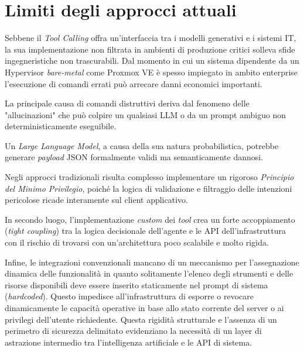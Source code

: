 \section{Limiti degli approcci attuali}
Sebbene il \textit{Tool Calling} offra un'interfaccia tra i modelli generativi e i sistemi IT, la sua implementazione non filtrata in ambienti di produzione critici solleva sfide ingegneristiche non trascurabili.
Dal momento in cui un sistema dipendente da un Hypervisor \textit{bare-metal} come Proxmox VE è spesso impiegato in ambito enterprise l'esecuzione di comandi errati può arrecare danni economici importanti.

La principale causa di comandi distruttivi deriva dal fenomeno delle "allucinazioni" che può colpire un qualsiasi LLM o da un prompt ambiguo non deterministicamente eseguibile.

Un \textit{Large Language Model}, a causa della sua natura probabilistica, potrebbe generare \textit{payload} JSON formalmente validi ma semanticamente dannosi.

Negli approcci tradizionali risulta complesso implementare un rigoroso \textit{Principio del Minimo Privilegio}, poiché la logica di validazione e filtraggio delle intenzioni pericolose ricade interamente sul client applicativo.

In secondo luogo, l'implementazione \textit{custom} dei \textit{tool} crea un forte accoppiamento (\textit{tight coupling}) tra la logica decisionale dell'agente e le API dell'infrastruttura con il rischio di trovarsi con un'architettura poco scalabile e molto rigida.

Infine, le integrazioni convenzionali mancano di un meccanismo per l'assegnazione dinamica delle funzionalità in quanto solitamente l'elenco degli strumenti e delle risorse disponibili deve essere inserito staticamente nel prompt di sistema (\textit{hardcoded}).
Questo impedisce all'infrastruttura di esporre o revocare dinamicamente le capacità operative in base allo stato corrente del server o ai privilegi dell'utente richiedente.
Questa rigidità strutturale e l'assenza di un perimetro di sicurezza delimitato evidenziano la necessità di un layer di astrazione intermedio tra l'intelligenza artificiale e le API di sistema.

